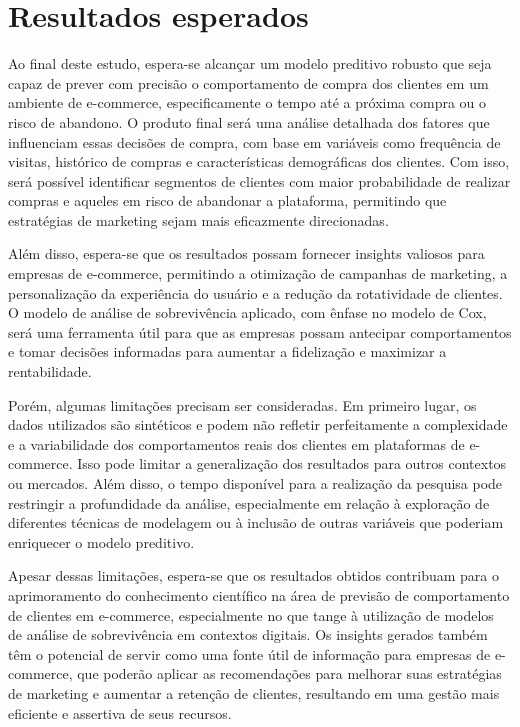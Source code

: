 \section{Resultados esperados}

Ao final deste estudo, espera-se alcançar um modelo preditivo robusto que seja capaz de prever com precisão o comportamento de compra dos clientes em um ambiente de e-commerce, especificamente o tempo até a próxima compra ou o risco de abandono. O produto final será uma análise detalhada dos fatores que influenciam essas decisões de compra, com base em variáveis como frequência de visitas, histórico de compras e características demográficas dos clientes. Com isso, será possível identificar segmentos de clientes com maior probabilidade de realizar compras e aqueles em risco de abandonar a plataforma, permitindo que estratégias de marketing sejam mais eficazmente direcionadas.

Além disso, espera-se que os resultados possam fornecer insights valiosos para empresas de e-commerce, permitindo a otimização de campanhas de marketing, a personalização da experiência do usuário e a redução da rotatividade de clientes. O modelo de análise de sobrevivência aplicado, com ênfase no modelo de Cox, será uma ferramenta útil para que as empresas possam antecipar comportamentos e tomar decisões informadas para aumentar a fidelização e maximizar a rentabilidade.

Porém, algumas limitações precisam ser consideradas. Em primeiro lugar, os dados utilizados são sintéticos e podem não refletir perfeitamente a complexidade e a variabilidade dos comportamentos reais dos clientes em plataformas de e-commerce. Isso pode limitar a generalização dos resultados para outros contextos ou mercados. Além disso, o tempo disponível para a realização da pesquisa pode restringir a profundidade da análise, especialmente em relação à exploração de diferentes técnicas de modelagem ou à inclusão de outras variáveis que poderiam enriquecer o modelo preditivo.

Apesar dessas limitações, espera-se que os resultados obtidos contribuam para o aprimoramento do conhecimento científico na área de previsão de comportamento de clientes em e-commerce, especialmente no que tange à utilização de modelos de análise de sobrevivência em contextos digitais. Os insights gerados também têm o potencial de servir como uma fonte útil de informação para empresas de e-commerce, que poderão aplicar as recomendações para melhorar suas estratégias de marketing e aumentar a retenção de clientes, resultando em uma gestão mais eficiente e assertiva de seus recursos.
